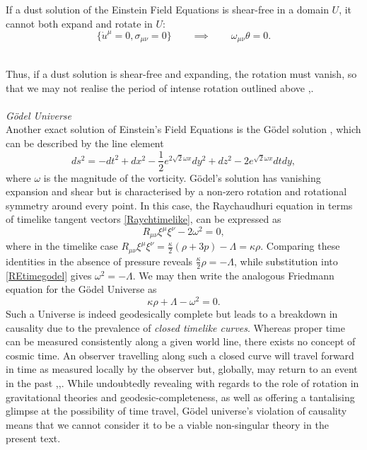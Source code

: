 \begin{theorem}
\label{theorem:sing1}
If a dust solution of the Einstein Field Equations is shear-free in a domain $U$, it cannot both expand and rotate in $U$:
\[
\{{\dot u}^\mu=0,\sigma_{\mu\nu}=0\}\qquad \implies\qquad \omega_{\mu\nu} \theta=0.
\]
\end{theorem}
~\\
Thus, if a dust solution is shear-free and expanding, the rotation must vanish, so that we may not realise the period of intense rotation outlined above \cite{Senovilla:1997bw},\cite{Ellis:2011pi}.
\\\\\emph{G{\" o}del Universe}\\
Another exact solution of Einstein's Field Equations is the G{\" o}del solution \cite{Godel}, which can be described by the line element \cite{Hawking:1973uf}
\[
ds^2=-dt^2+dx^2-\frac{1}{2}e^{2\sqrt{2} \omega x}dy^2+dz^2-2 e^{\sqrt{2} \omega x} dt dy
,\]
where $\omega$ is the magnitude of the vorticity. G{\" o}del's solution has vanishing expansion and shear but is characterised by a non-zero rotation and rotational symmetry around every point. In this case, the Raychaudhuri equation in terms of timelike tangent vectors \eqref{Raychtimelike}, can be expressed as
\[
\label{REtimegodel}
R_{\mu\nu}\xi^\mu \xi^\nu-2\omega^2=0
,\]
where in the timelike case $R_{\mu\nu} \xi^\mu \xi^\nu=\frac{\kappa}{2}(\rho+3p)-\Lambda=\kappa \rho$. Comparing these identities in the absence of pressure reveals $\frac{\kappa}{2}\rho=-\Lambda$, while substitution into \eqref{REtimegodel} gives $\omega^2=-\Lambda$. We may then write the analogous Friedmann equation for the G{\" o}del Universe as
\[
\kappa\rho+\Lambda-\omega^2=0
.\] 
Such a Universe is indeed geodesically complete but leads to a breakdown in causality due to the prevalence of \emph{closed timelike curves}. Whereas proper time can be measured consistently along a given world line, there exists no concept of cosmic time. An observer travelling along such a closed curve will travel forward in time as measured locally by the observer but, globally, may return to an event in the past \cite{ellis2012relativistic},\cite{Barrow:2003ph},\cite{Lobo:2010sz}. While undoubtedly revealing with regards to the role of rotation in gravitational theories and geodesic-completeness, as well as offering a tantalising  glimpse at the possibility of time travel, G{\" o}del universe's violation of causality means that we cannot consider it to be a viable non-singular theory in the present text.
